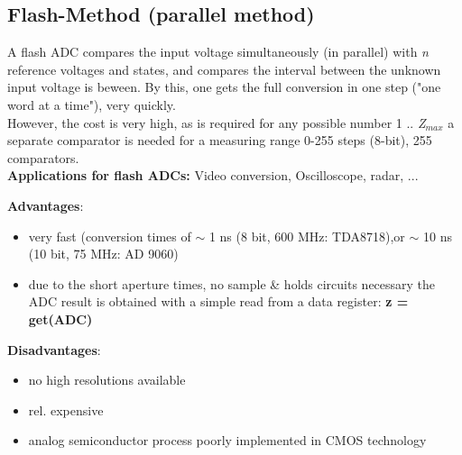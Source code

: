 \subsection{Flash-Method (parallel method)}

A flash ADC compares the input voltage simultaneously (in parallel) with \textit{n} reference voltages and states, and compares the interval between the unknown input voltage is beween. By this, one gets the full conversion in one step ("one word at a time"), very quickly.\\

However, the cost is very high, as is required for any possible number 1 .. \textit{Z${}_{max}$} a separate comparator is needed  for a measuring range 0-255 steps (8-bit), 255 comparators.\\

\textbf{Applications for flash ADCs:} Video conversion, Oscilloscope, radar, ...\\

\os{\newpage}

\textbf{Advantages}: 

\begin{itemize}
\item  very fast (conversion times of $\mathrm{\sim}$ 1 ns (8 bit, 600 MHz: TDA8718),or $\mathrm{\sim}$ 10 ns (10 bit, 75 MHz: AD 9060)
\item  due to the short aperture times, no sample \& holds circuits necessary the ADC result is obtained with a simple read from a data register: \textbf{z = get(ADC)}
\end{itemize}

\textbf{Disadvantages}:

\begin{itemize}
\item  no high resolutions available
\item  rel. expensive 
\item  analog semiconductor process  poorly implemented in CMOS technology
\end{itemize}
\os{\newpage}
    
